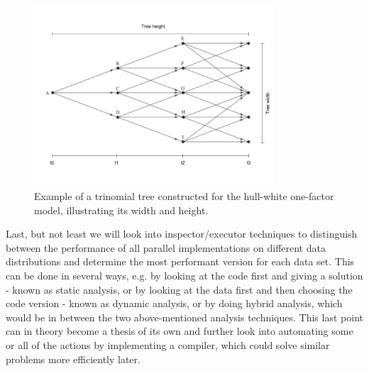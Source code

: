 \begin{figure}[H]
	\centering
	\includegraphics[width=0.8\textwidth]{img/treeconststage1wh.jpg}
	\caption{Example of a trinomial tree constructed for the hull-white one-factor model, illustrating its width and height.}
	\label{fig:intro:tree}
\end{figure}

Last, but not least we will look into inspector/executor techniques to distinguish between the performance of all parallel implementations on different data distributions and determine the most performant version for each data set. This can be done in several ways, e.g. by looking at the code first and giving a solution - known as static analysis, or by looking at the data first and then choosing the code version - known as dynamic analysis, or by doing hybrid analysis, which would be in between the two above-mentioned analysis techniques. This last point can in theory become a thesis of its own and further look into automating some or all of the actions by implementing a compiler, which could solve similar problems more efficiently later. 


